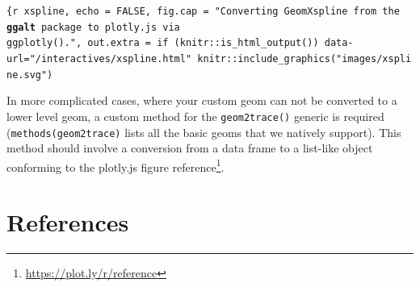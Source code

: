 \documentclass[
  12pt,
]{krantz}
\renewcommand{\href}[2]{#2\footnote{\url{#1}}}
\begin{document}
\texttt{\{r\ xspline,\ echo\ =\ FALSE,\ fig.cap\ =\ "Converting GeomXspline from the \textbf{ggalt} package to plotly.js via \texttt{ggplotly()}.",\ out.extra\ =\ if\ (knitr::is\_html\_output())\ \textquotesingle{}data-url="/interactives/xspline.html"\textquotesingle{}\ knitr::include\_graphics("images/xspline.svg")}

In more complicated cases, where your custom geom can not be converted to a lower level geom, a custom method for the \texttt{geom2trace()} generic is required (\texttt{methods(geom2trace)} lists all the basic geoms that we natively support). This method should involve a conversion from a data frame to a list-like object conforming to the \href{https://plot.ly/r/reference}{plotly.js figure reference}.

\hypertarget{references}{%
\chapter*{References}\label{references}}
\end{document}
